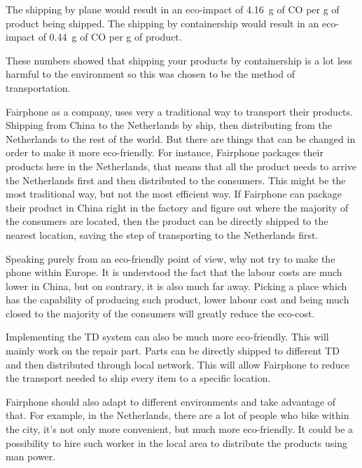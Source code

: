 \documentclass[final,a4paper]{report} %
\begin{document}
The shipping by plane would result in an eco-impact of \SI{4.16}{\gram} of CO per g of product being shipped.
The shipping by containership would result in an eco-impact of \SI{0.44}{\gram} of CO per g of product.

These numbers showed that shipping your products by containership is a lot less harmful to the environment so this was chosen to be the method of transportation.

Fairphone as a company, uses very a traditional way to transport their products. Shipping from China to the Netherlands by ship, then distributing from the Netherlands to the rest of the world. But there are things that can be changed in order to make it more eco-friendly. For instance, Fairphone packages their products here in the Netherlands, that means that all the product needs to arrive the Netherlands first and then distributed to the consumers. This might be the most traditional way, but not the most efficient way. If Fairphone can package their product in China right in the factory and figure out where the majority of the consumers are located, then the product can be directly shipped to the nearest location, saving the step of transporting to the Netherlands first. 

Speaking purely from an eco-friendly point of view, why not try to make the phone within Europe. It is understood the fact that the labour costs are much lower in China, but on contrary, it is also much far away. Picking a place which has the capability of producing such product, lower labour cost and being much closed to the majority of the consumers will greatly reduce the eco-cost. 

Implementing the TD system can also be much more eco-friendly. This will mainly work on the repair part. Parts can be directly shipped to different TD and then distributed through local network. This will allow Fairphone to reduce the transport needed to ship every item to a specific location. 

Fairphone should also adapt to different environments and take advantage of that. For example, in the Netherlands, there are a lot of people who bike within the city, it’s not only more convenient, but much more eco-friendly. It could be a possibility to hire such worker in the local area to distribute the products using man power. 
\end{document}
